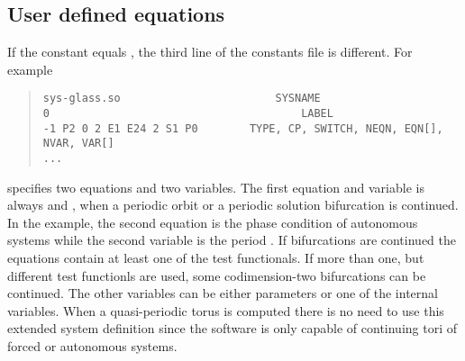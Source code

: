 \documentclass[10pt,a4paper]{ddedoc}
\begin{document}
\subsection{User defined equations}
If the  constant equals , the third line of the constants file is different. For example
{ \small \begin{quote} \begin{lstlisting}[basicstyle=\tt,frame=single]
sys-glass.so						SYSNAME
0										LABEL
-1 P2 0 2 E1 E24 2 S1 P0		TYPE, CP, SWITCH, NEQN, EQN[], NVAR, VAR[]
...
\end{lstlisting} \end{quote} } \noindent
specifies two equations and two variables. The first equation and variable is always  and , when a periodic orbit or a periodic solution bifurcation is continued. In the example, the second equation  is the phase condition of autonomous systems while the second variable is the period . If bifurcations are continued the equations contain at least one of the test functionals. If more than one, but different test functionls are used, some codimension-two bifurcations can be continued. The other variables can be either parameters or one of the internal variables. When a quasi-periodic torus is computed there is no need to use this extended system definition since the software is only capable of continuing tori of forced or autonomous systems.
\end{document}
